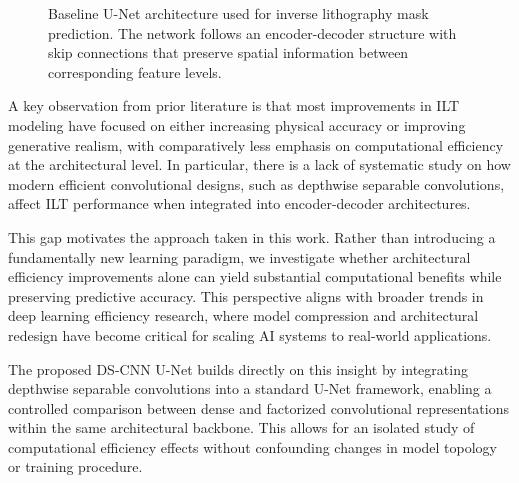 \documentclass[conference]{IEEEtran}
\begin{document}
\begin{figure}[!t]

\caption{Baseline U-Net architecture used for inverse lithography mask prediction. The network follows an encoder-decoder structure with skip connections that preserve spatial information between corresponding feature levels.}
\label{fig:unet_architecture}
\end{figure}

A key observation from prior literature is that most improvements in ILT modeling have focused on either increasing physical accuracy or improving generative realism, with comparatively less emphasis on computational efficiency at the architectural level. In particular, there is a lack of systematic study on how modern efficient convolutional designs, such as depthwise separable convolutions, affect ILT performance when integrated into encoder-decoder architectures.

This gap motivates the approach taken in this work. Rather than introducing a fundamentally new learning paradigm, we investigate whether architectural efficiency improvements alone can yield substantial computational benefits while preserving predictive accuracy. This perspective aligns with broader trends in deep learning efficiency research, where model compression and architectural redesign have become critical for scaling AI systems to real-world applications.

The proposed DS-CNN U-Net builds directly on this insight by integrating depthwise separable convolutions into a standard U-Net framework, enabling a controlled comparison between dense and factorized convolutional representations within the same architectural backbone. This allows for an isolated study of computational efficiency effects without confounding changes in model topology or training procedure.
\end{document}
